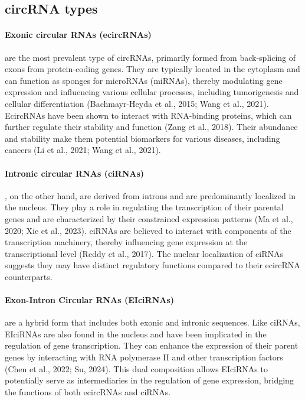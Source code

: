 \subsection{circRNA types}
\label{sec:circrna_types}

\paragraph{Exonic circular RNAs (ecircRNAs)} are the most prevalent type of
circRNAs, primarily formed from back-splicing of exons from protein-coding
genes.
They are typically located in the cytoplasm and can function as sponges for
microRNAs (miRNAs), thereby modulating gene expression and influencing various
cellular processes, including tumorigenesis and cellular differentiation
(Bachmayr-Heyda et al., 2015; Wang et al., 2021).
EcircRNAs have been shown to interact with RNA-binding proteins, which can
further regulate their stability and function (Zang et al., 2018).
Their abundance and stability make them potential biomarkers for various
diseases, including cancers (Li et al., 2021; Wang et al., 2021).

\paragraph{Intronic circular RNAs (ciRNAs)}, on the other hand, are derived
from introns
and are predominantly localized in the nucleus.
They play a role in regulating the transcription of their parental genes and
are characterized by their constrained expression patterns (Ma et al., 2020;
Xie et al., 2023).
ciRNAs are
believed to interact with components of the transcription machinery, thereby
influencing gene expression at the transcriptional level (Reddy et al., 2017).
The nuclear localization of ciRNAs suggests they may have distinct regulatory
functions compared to their ecircRNA counterparts.

\paragraph{Exon-Intron Circular RNAs (EIciRNAs)} are a hybrid form that
includes both
exonic and intronic sequences.
Like ciRNAs, EIciRNAs are also found in the nucleus and have been implicated in
the regulation of gene transcription.
They can enhance the expression of their parent genes by interacting with RNA
polymerase II and other transcription factors (Chen et al., 2022; Su, 2024).
This dual composition allows EIciRNAs to potentially serve as intermediaries in
the regulation of gene expression, bridging the functions of both ecircRNAs and
ciRNAs.

